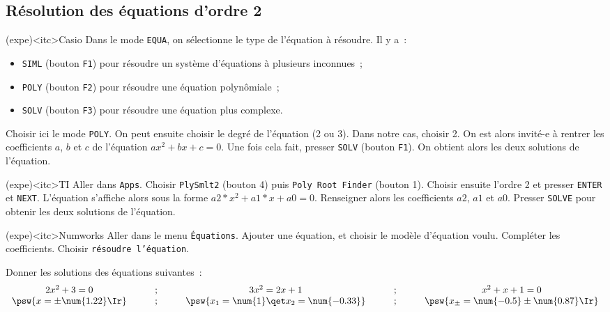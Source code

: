 \documentclass[../main/main.tex]{subfiles}
\begin{document}
\subsection{R\'esolution des équations d'ordre 2}

\begin{tcb}(expe)<itc>{Casio}
	Dans le mode \texttt{EQUA}, on sélectionne le type de l'équation à résoudre.
	Il y a~:
	\begin{itemize}
		\item \texttt{SIML} (bouton \texttt{F1}) pour résoudre un système
		      d'équations à plusieurs inconnues~;
		\item \texttt{POLY} (bouton \texttt{F2}) pour résoudre une équation
		      polynômiale~;
		\item \texttt{SOLV} (bouton \texttt{F3}) pour résoudre une équation plus
		      complexe.
	\end{itemize}
	Choisir ici le mode \texttt{POLY}. On peut ensuite choisir le degré de
	l'équation (2 ou 3). Dans notre cas, choisir 2. On est alors invité-e à
	rentrer les coefficients $a$, $b$ et $c$ de l'équation $ax^2+bx+c=0$. Une fois
	cela fait, presser \texttt{SOLV} (bouton \texttt{F1}). On obtient alors les
	deux solutions de l'équation.
\end{tcb}

\begin{tcb}(expe)<itc>{TI}
	Aller dans \texttt{Apps}. Choisir \texttt{PlySmlt2} (bouton 4) puis
	\texttt{Poly Root Finder} (bouton 1). Choisir ensuite l'ordre 2 et presser
	\texttt{ENTER} et \texttt{NEXT}. L'équation s'affiche alors sous la forme
	$a2*x^2+a1*x+a0=0$. Renseigner alors les coefficients $a2$, $a1$ et $a0$.
	Presser \texttt{SOLVE} pour obtenir les deux solutions de l'équation.
\end{tcb}

\begin{tcb}(expe)<itc>{Numworks}
	Aller dans le menu \texttt{Équations}. Ajouter une équation, et choisir le
	modèle d'équation voulu. Compléter les coefficients. Choisir \texttt{résoudre
		l'équation}.
\end{tcb}

Donner les solutions des équations suivantes~:
\begin{gather*}
	\begin{array}{ccccc}
		2x^2+3 = 0
		\qquad & ; & \qquad
		3x^2 = 2x+1
		\qquad & ; & \qquad
		x^2+x+1 = 0
		\\
		\psw{
			x = \pm \num{1.22}\Ir
		}
		\qquad & ; & \qquad
		\psw{
			x_1 = \num{1} \qet x_2 = \num{-0.33}
		}
		\qquad & ; & \qquad
		\psw{
			x_\pm = \num{-0.5} \pm \num{0.87}\Ir
		}
	\end{array}
\end{gather*}
\end{document}
